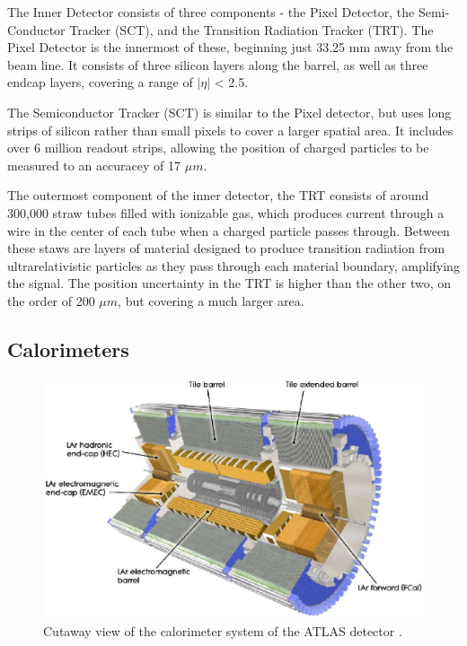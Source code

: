 The Inner Detector consists of three components - the Pixel Detector, the Semi-Conductor Tracker (SCT), and the Transition Radiation Tracker (TRT). The Pixel Detector is the innermost of these, beginning just 33.25 mm away from the beam line. It consists of three silicon layers along the barrel, as well as three endcap layers, covering a range of $|\eta|$ < 2.5. 

The Semiconductor Tracker (SCT) is similar to the Pixel detector, but uses long strips of silicon rather than small pixels to cover a larger spatial area. It includes over 6 million readout strips, allowing the position of charged particles to be measured to an accuracey of 17 $\mu m$.

The outermost component of the inner detector, the TRT consists of around 300,000 straw tubes filled with ionizable gas, which produces current through a wire in the center of each tube when a charged particle passes through. Between these staws are layers of material designed to produce transition radiation from ultrarelativistic particles as they pass through each material boundary, amplifying the signal. The position uncertainty in the TRT is higher than the other two, on the order of 200 $\mu m$, but covering a much larger area.

\subsection{Calorimeters}
\label{sec:calo}

\begin{figure}[H]
\centering
   \includegraphics[width=0.9\linewidth]{figures/lhc/calorimeter.eps}
\caption{Cutaway view of the calorimeter system of the ATLAS detector \cite{caloFig}.}
\label{fig:calo}
\end{figure}

